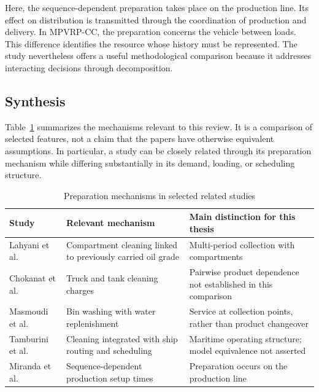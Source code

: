 Here, the sequence-dependent preparation takes place on the production
line. Its effect on distribution is transmitted through the coordination of
production and delivery. In MPVRP-CC, the preparation concerns the vehicle
between loads. This difference identifies the resource whose history must
be represented. The study nevertheless offers a useful methodological
comparison because it addresses interacting decisions through decomposition.

\subsection{Synthesis}

Table~\ref{tab:cleaning-literature} summarizes the mechanisms relevant to this
review. It is a comparison of selected features, not a claim that the papers
have otherwise equivalent assumptions. In particular, a study can be closely
related through its preparation mechanism while differing substantially in
its demand, loading, or scheduling structure.

\begin{table}[htbp]
  \centering
  \small
  \caption{Preparation mechanisms in selected related studies}
  \label{tab:cleaning-literature}
  \begin{tabularx}{\textwidth}{@{}p{}XX@{}}
    \toprule
    Study & Relevant mechanism & Main distinction for this thesis \\
    \midrule
    Lahyani et al.~\cite{lahyani2015oilmulticompartment}
      & Compartment cleaning linked to previously carried oil grade
      & Multi-period collection with compartments \\[0.5em]
    Chokanat et al.~\cite{agriengineering1010006}
      & Truck and tank cleaning charges
      & Pairwise product dependence not established in this comparison \\[0.5em]
    Masmoudi et al.~\cite{masmoudi2024multi}
      & Bin washing with water replenishment
      & Service at collection points, rather than product changeover \\[0.5em]
    Tamburini et al.~\cite{TAMBURINI2025104019}
      & Cleaning integrated with ship routing and scheduling
      & Maritime operating structure; model equivalence not asserted \\[0.5em]
    Miranda et al.~\cite{MIRANDA2018211}
      & Sequence-dependent production setup times
      & Preparation occurs on the production line \\
    \bottomrule
  \end{tabularx}
\end{table}

